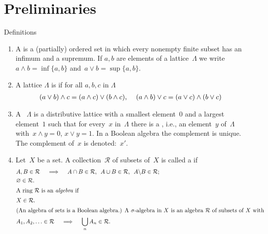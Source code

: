 \documentclass[main.tex]{subfiles}
\begin{document}
\section{Preliminaries}
%
%
\begin{psec}{Definitions}
\label{1.1}
\begin{enumerate}
\item
\label{1.1-1} 
A  is a (partially) ordered set in which
every nonempty finite subset has an infimum and a supremum. 
If $a,b$ are elements of a lattice~$\Lambda$ 
we write~$a\wedge b = \inf\{a,b\}$
and~$a\vee b = \sup\{a,b\}$.
\item 
\label{1.1-2}
A lattice $\Lambda$ is 
if for all $a,b,c$ in $\Lambda$
\begin{align*}
(a\vee b)\wedge c &= (a\wedge c)\vee (b\wedge c)\textnormal{, } &
(a\wedge b)\vee c &= (a\vee c) \wedge (b\vee c) 
\end{align*}
\item 
\label{1.1-3}
A ~$\Lambda$ is a distributive lattice
with a smallest element~$0$
and a largest element~$1$
such that for every~$x$ in~$\Lambda$
there is a ,
i.e., 
an element~$y$ of~$\Lambda$
with~$x\wedge y=0$, $x\vee y=1$.
In a Boolean algebra the complement is unique.
The complement of~$x$ is denoted:~$x'$.
\item 
\label{1.1-4}
Let~$X$ be a set.
A collection~$\mathcal{R}$ 
of subsets of~$X$
is called a  if
\begin{align*}
&A,B\in\mathcal{R} \quad \implies \quad 
  A\cap B \in \mathcal{R}\htam{, }\ 
  A\cup B \in \mathcal{R}\htam{, }\ 
  A\backslash B \in \mathcal{R}\htam{; } \\
&\varnothing \in \mathcal{R} 
\htam{.} \\
\intertext{%
A ring~$\mathcal{R}$ is an \keyword{algebra} if%
}
&X \in \mathcal{R}
\htam{.} \\
\intertext{%
(An algebra of sets is a Boolean algebra.) 
A $\sigma$-algebra in~$X$
is an algebra~$\mathcal{R}$
of subsets of~$X$
with%
}
& A_1, A_2, \ldots \in \mathcal{R}\quad \implies\quad 
  \bigcup_n A_n \in \mathcal{R}
\htam{.}
\end{align*}
\end{enumerate}
\end{psec}
\end{document}
